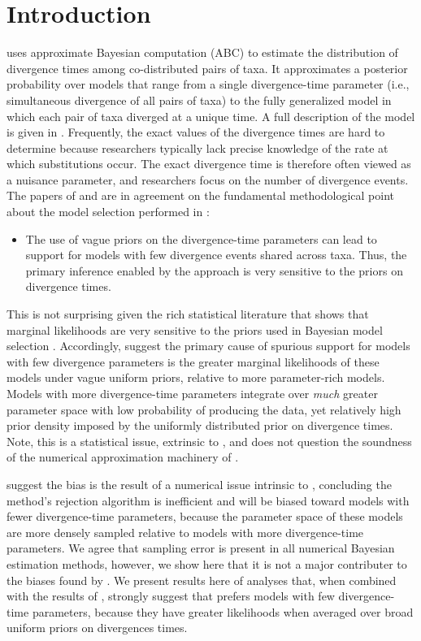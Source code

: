 \section{Introduction}

\msb \citep{Huang2011} uses approximate Bayesian computation (ABC) to estimate
the distribution of divergence times among co-distributed pairs of taxa.
It approximates a posterior probability over models that range from a single
divergence-time parameter (i.e., simultaneous divergence of all pairs of taxa)
to the fully generalized model in which each pair of taxa diverged at a
unique time.
A full description of the model is given in \citet{Oaks2012}.
Frequently, the exact values of the divergence times are hard 
to determine because researchers typically lack precise knowledge 
of the rate at which substitutions occur.
The exact divergence time is therefore often viewed as a nuisance parameter,
and researchers focus on the number of divergence events.
The papers of \citet{Oaks2012} and \citet{Hickerson2013} are in agreement
on the fundamental methodological point about the model selection performed in \msb:
\begin{itemize}
   \item The use of vague priors on the divergence-time parameters can lead to
       support for models with few divergence events shared across taxa. Thus,
       the primary inference enabled by the approach is very sensitive to the
       priors on divergence times.
\end{itemize}

This is not surprising given the rich statistical literature that shows that
marginal likelihoods are very sensitive to the priors used in Bayesian model
selection
\citep[e.g.,][]{Jeffreys1939,Lindley1957}.
Accordingly, \citet{Oaks2012} suggest the primary cause of spurious support
for models with few divergence parameters is the greater marginal likelihoods
of these models under vague uniform priors, relative to more parameter-rich
models.
Models with more divergence-time parameters integrate over \emph{much} greater
parameter space with low probability of producing the data, yet relatively high
prior density imposed by the uniformly distributed prior on divergence times.
Note, this is a statistical issue, extrinsic to \msb, and does not question the
soundness of the numerical approximation machinery of \msb.

\citet{Hickerson2013} suggest the bias is the result of a numerical issue
intrinsic to \msb, concluding the method's rejection algorithm is inefficient
and will be biased toward models with fewer divergence-time parameters, because
the parameter space of these models are more densely sampled relative to models
with more divergence-time parameters.
We agree that sampling error is present in all numerical Bayesian estimation
methods, however, we show here that it is not a major contributer to the
biases found by \citet{Oaks2012}.
We present results here of analyses that, when combined with the results
of \citet{Oaks2012}, strongly suggest that \msb prefers models with few
divergence-time parameters, because they have greater likelihoods when
averaged over broad uniform priors on divergences times.

